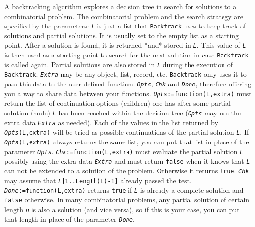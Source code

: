 \documentclass[a4paper,11pt]{report}
\begin{document}
{{{A backtracking algorithm explores a decision tree in search for solutions to a
combinatorial problem. The combinatorial problem and the search strategy are
specified by the parameters: \mbox{\texttt{\mdseries\slshape L}} is just a list that \texttt{Backtrack} uses to keep track of solutions and partial solutions. It is usually set to
the empty list as a starting point. After a solution is found, it is returned
*and* stored in \mbox{\texttt{\mdseries\slshape L}}. This value of \mbox{\texttt{\mdseries\slshape L}} is then used as a starting point to search for the next solution in case \texttt{Backtrack} is called again. Partial solutions are also stored in \mbox{\texttt{\mdseries\slshape L}} during the execution of \texttt{Backtrack}. \mbox{\texttt{\mdseries\slshape Extra}} may be any object, list, record, etc. \texttt{Backtrack} only uses it to pass this data to the user-defined functions \mbox{\texttt{\mdseries\slshape Opts}}, \mbox{\texttt{\mdseries\slshape Chk}} and \mbox{\texttt{\mdseries\slshape Done}}, therefore offering you a way to share data between your functions. \mbox{\texttt{\mdseries\slshape Opts}}\texttt{:=function(L,extra)} must return the list of continuation options (children) one has after some
partial solution (node) \mbox{\texttt{\mdseries\slshape L}} has been reached within the decision tree (\mbox{\texttt{\mdseries\slshape Opts}} may use the extra data \mbox{\texttt{\mdseries\slshape Extra}} as needed). Each of the values in the list returned by \mbox{\texttt{\mdseries\slshape Opts}}\texttt{(L,extra)} will be tried as possible continuations of the partial solution \mbox{\texttt{\mdseries\slshape L}}. If \mbox{\texttt{\mdseries\slshape Opts}}\texttt{(L,extra)} always returns the same list, you can put that list in place of the parameter \mbox{\texttt{\mdseries\slshape Opts}}. \mbox{\texttt{\mdseries\slshape Chk}}\texttt{:=function(L,extra)} must evaluate the partial solution \mbox{\texttt{\mdseries\slshape L}} possibly using the extra data \mbox{\texttt{\mdseries\slshape Extra}} and must return \texttt{false} when it knows that \mbox{\texttt{\mdseries\slshape L}} can not be extended to a solution of the problem. Otherwise it returns \texttt{true}. \mbox{\texttt{\mdseries\slshape Chk}} may assume that \mbox{\texttt{\mdseries\slshape L}}\texttt{\texttt{}[1..Length(L)-1]\texttt{}} already passed the test. \mbox{\texttt{\mdseries\slshape Done}}\texttt{:=function(L,extra)} returns \texttt{true} if \mbox{\texttt{\mdseries\slshape L}} is already a complete solution and \texttt{false} otherwise. In many combinatorial problems, any partial solution of certain
length \mbox{\texttt{\mdseries\slshape n}} is also a solution (and vice versa), so if this is your case, you can put that
length in place of the parameter \mbox{\texttt{\mdseries\slshape Done}}. 

}}}
\end{document}
